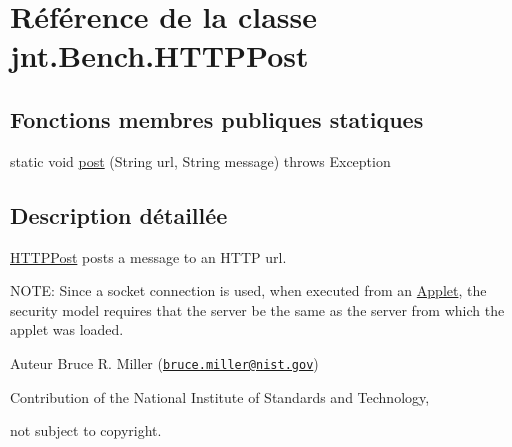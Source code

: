 \hypertarget{classjnt_1_1Bench_1_1HTTPPost}{\section{Référence de la classe jnt.\-Bench.\-H\-T\-T\-P\-Post}
\label{classjnt_1_1Bench_1_1HTTPPost}
}
\subsection*{Fonctions membres publiques statiques}
\begin{DoxyCompactItemize}
\item 
static void \hyperlink{classjnt_1_1Bench_1_1HTTPPost_a78cdbd9839f7ad4bd8b7475db31c2316}{post} (String url, String message)  throws Exception 
\end{DoxyCompactItemize}


\subsection{Description détaillée}
\hyperlink{classjnt_1_1Bench_1_1HTTPPost}{H\-T\-T\-P\-Post} posts a message to an H\-T\-T\-P url.

N\-O\-T\-E\-: Since a socket connection is used, when executed from an \hyperlink{classjnt_1_1Bench_1_1Applet}{Applet}, the security model requires that the server be the same as the server from which the applet was loaded.

\begin{DoxyAuthor}{Auteur}
Bruce R. Miller (\href{mailto:bruce.miller@nist.gov}{\tt bruce.\-miller@nist.\-gov}) 

Contribution of the National Institute of Standards and Technology, 

not subject to copyright. 
\end{DoxyAuthor}


